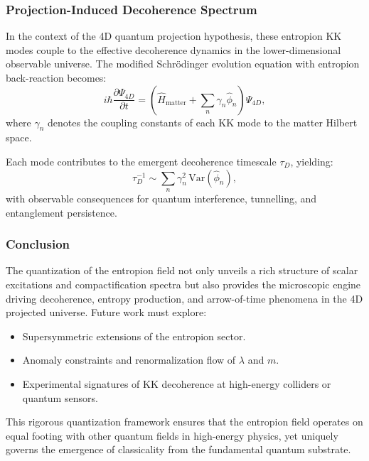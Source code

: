 \documentclass[12pt]{article}
\begin{document}
\subsubsection*{Projection-Induced Decoherence Spectrum}

In the context of the 4D quantum projection hypothesis, these entropion KK modes couple to the effective decoherence dynamics in the lower-dimensional observable universe. The modified Schrödinger evolution equation with entropion back-reaction becomes:
\begin{equation}
i\hbar \frac{\partial \Psi_{4D}}{\partial t} = \left( \hat{H}_{\text{matter}} + \sum_n \gamma_n \hat{\phi}_n \right) \Psi_{4D},
\label{eq:decoherence_hamiltonian}
\end{equation}
where \( \gamma_n \) denotes the coupling constants of each KK mode to the matter Hilbert space.

Each mode contributes to the emergent decoherence timescale \( \tau_D \), yielding:
\begin{equation}
\tau_D^{-1} \sim \sum_n \gamma_n^2 \, \text{Var}(\hat{\phi}_n),
\label{eq:decoherence_timescale}
\end{equation}
with observable consequences for quantum interference, tunnelling, and entanglement persistence.

\subsubsection*{Conclusion}

The quantization of the entropion field not only unveils a rich structure of scalar excitations and compactification spectra but also provides the microscopic engine driving decoherence, entropy production, and arrow-of-time phenomena in the 4D projected universe. Future work must explore:
\begin{itemize}
  \item Supersymmetric extensions of the entropion sector.
  \item Anomaly constraints and renormalization flow of \( \lambda \) and \( m \).
  \item Experimental signatures of KK decoherence at high-energy colliders or quantum sensors.
\end{itemize}

This rigorous quantization framework ensures that the entropion field operates on equal footing with other quantum fields in high-energy physics, yet uniquely governs the emergence of classicality from the fundamental quantum substrate.
\end{document}

